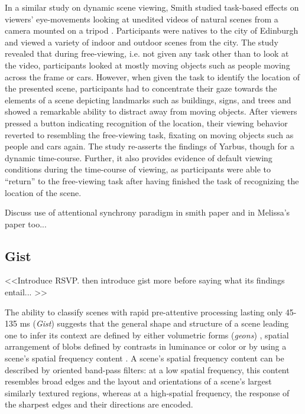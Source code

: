 In a similar study on dynamic scene viewing, Smith studied task-based effects on viewers' eye-movements looking at unedited videos of natural scenes from a camera mounted on a tripod \cite{Smith2011a}.  Participants were natives to the city of Edinburgh and viewed a variety of indoor and outdoor scenes from the city.  The study revealed that during free-viewing, i.e. not given any task other than to look at the video, participants looked at mostly moving objects such as people moving across the frame or cars.  However, when given the task to identify the location of the presented scene, participants had to concentrate their gaze towards the elements of a scene depicting landmarks such as buildings, signs, and trees and showed a remarkable ability to distract away from moving objects.  After viewers pressed a button indicating recognition of the location, their viewing behavior reverted to resembling the free-viewing task, fixating on moving objects such as people and cars again.  The study re-asserts the findings of Yarbus, though for a dynamic time-course.  Further, it also provides evidence of default viewing conditions during the time-course of viewing, as participants were able to ``return'' to the free-viewing task after having finished the task of recognizing the location of the scene.  

Discuss use of attentional synchrony paradigm in smith paper and in Melissa's paper too...

\subsection{Gist}
\label{sec:gist}

<<Introduce RSVP. then introduce gist more before saying what its findings entail... >>

The ability to classify scenes with rapid pre-attentive processing lasting only 45-135 ms (\textit{Gist}) \cite{Potter1969,Biederman1974,Potter1976,Schyns1994,Henderson1999} suggests that the general shape and structure of a scene leading one to infer its context are defined by either volumetric forms (\textit{geons}) \cite{Biederman1987}, spatial arrangement of blobs defined by contrasts in luminance or color \cite{Schyns1994,Oliva1997} or by using a scene's spatial frequency content \cite{Oliva2001,Oliva2005}.  A scene's spatial frequency content can be described by oriented band-pass filters: at a low spatial frequency, this content resembles broad edges and the layout and orientations of a scene's largest similarly textured regions, whereas at a high-spatial frequency, the response of the sharpest edges and their directions are encoded.  

